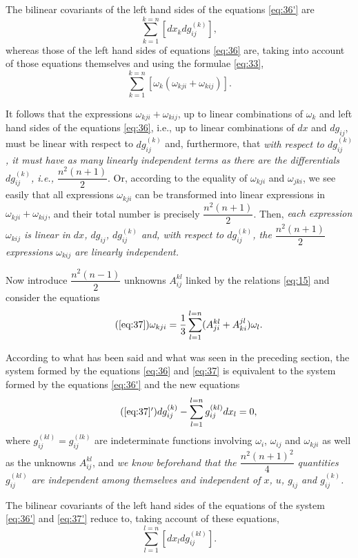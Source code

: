 \documentclass[leqno,12pt]{article}
\theoremstyle{shape1}
\theoremstyle{shape0}
\theoremstyle{shape2}
\theoremstyle{definition}
\begin{document}
The bilinear covariants of the left hand sides of the equations \eqref{eq:36'} are
\[
\sum_{k=1}^{k=n}[dx_{k}dg_{ij}^{(k)}],
\]
whereas those of the left hand sides of equations \eqref{eq:36} are, taking into account of those equations themselves and using the formulae \eqref{eq:33},
\[
\sum_{k=1}^{k=n}[\omega_{k}(\omega_{kji}+\omega_{kij})].
\]

It follows that the expressions $\omega_{kji}+\omega_{kij}$, up to linear combinations of $\omega_{k}$ and left hand sides of the equations \eqref{eq:36}, i.e., up to linear combinations of $dx$ and $dg_{ij}$, must be linear with respect to $dg_{ij}^{(k)}$ and, furthermore, that \emph{with respect to $dg_{ij}^{(k)}$, it must have as many linearly independent terms as there are the differentials $dg_{ij}^{(k)}$, i.e., $\dfrac{n^{2}(n+1)}{2}$}. Or, according to the equality of $\omega_{kji}$ and $\omega_{jki}$, we see easily that all expressions $\omega_{kji}$ can be transformed into linear expressions in $\omega_{kji}+\omega_{kij}$, and their total number is precisely $\dfrac{n^{2}(n+1)}{2}$. Then, \emph{each expression $\omega_{kij}$ is linear in $dx$, $dg_{ij}$, $dg_{ij}^{(k)}$ and, with respect to $dg_{ij}^{(k)}$, the $\dfrac{n^{2}(n+1)}{2}$ expressions $\omega_{kij}$ are linearly independent.}

Now introduce $\dfrac{n^{2}(n-1)}{2}$ unknowns $A_{ij}^{kl}$ linked by the relations \eqref{eq:15} and consider the equations
\begin{equation}
  \label{eq:37a}\tag{\ref{eq:37}}
  \omega_{kji}=\frac{1}{3}\sum_{l=1}^{l=n}(A^{kl}_{ji}+A^{jl}_{ki})\omega_{l}.
\end{equation}

According to what has been said and what was seen in the preceding section, the system formed by the equations \eqref{eq:36} and \eqref{eq:37} is equivalent to the system formed by the equations \eqref{eq:36'} and the new equations
\begin{equation}
  \label{eq:37'}\tag{\ref{eq:37}$'$}
  dg_{ij}^{(k)}-\sum_{l=1}^{l=n}g_{ij}^{(kl)}dx_{l}=0,
\end{equation}
where $g_{ij}^{(kl)}=g_{ij}^{(lk)}$ are indeterminate functions involving $\omega_{i}$, $\omega_{ij}$ and $\omega_{kji}$ as well as the unknowns $A^{kl}_{ij}$, and \emph{we know beforehand that the $\dfrac{n^{2}(n+1)^{2}}{4}$ quantities $g_{ij}^{(kl)}$ are independent among themselves and independent of $x$, $u$, $g_{ij}$ and $g_{ij}^{(k)}$.}

The bilinear covariants of the left hand sides of the equations of the system \eqref{eq:36'} and \eqref{eq:37'} reduce to, taking account of these equations,
\[
\sum_{l=1}^{l=n}[dx_{l}dg_{ij}^{(kl)}].
\]
\end{document}
